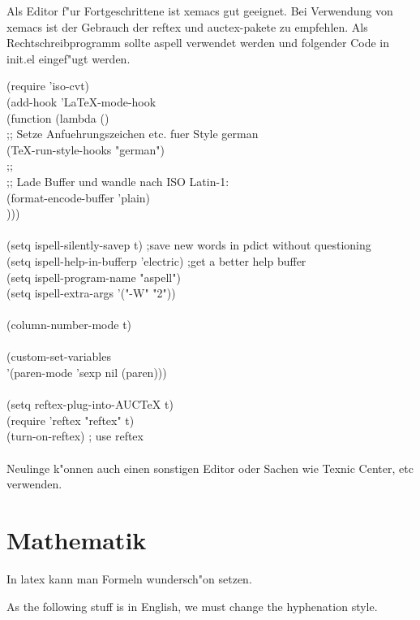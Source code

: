 Als Editor f"ur Fortgeschrittene ist xemacs gut geeignet.
Bei Verwendung von xemacs ist der Gebrauch der reftex und auctex-pakete zu empfehlen.
Als Rechtschreibprogramm sollte aspell verwendet werden und folgender Code in init.el eingef"ugt werden.


 (require 'iso-cvt)\\
  (add-hook 'LaTeX-mode-hook\\
    (function (lambda ()\\
      ;; Setze Anfuehrungszeichen etc. fuer Style german\\
      (TeX-run-style-hooks "german")\\
      ;;\\
      ;; Lade Buffer und wandle nach ISO Latin-1:\\
      (format-encode-buffer 'plain)\\
      )))\\
\\
      (setq ispell-silently-savep t) ;save new words in pdict without questioning\\
(setq ispell-help-in-bufferp 'electric) ;get a better help buffer\\
(setq ispell-program-name "aspell")\\
(setq ispell-extra-args '("-W" "2"))\\
\\
(column-number-mode t)\\
\\
(custom-set-variables\\
 '(paren-mode 'sexp nil (paren)))\\
\\
 (setq reftex-plug-into-AUCTeX t)\\
(require 'reftex "reftex" t)\\
 (turn-on-reftex) ; use reftex\\
\\
 


Neulinge k"onnen auch einen sonstigen Editor oder Sachen wie Texnic Center, etc verwenden.

\section{Mathematik}

In latex kann man Formeln wundersch"on setzen.

As the following stuff is in English, we must change the hyphenation style.


